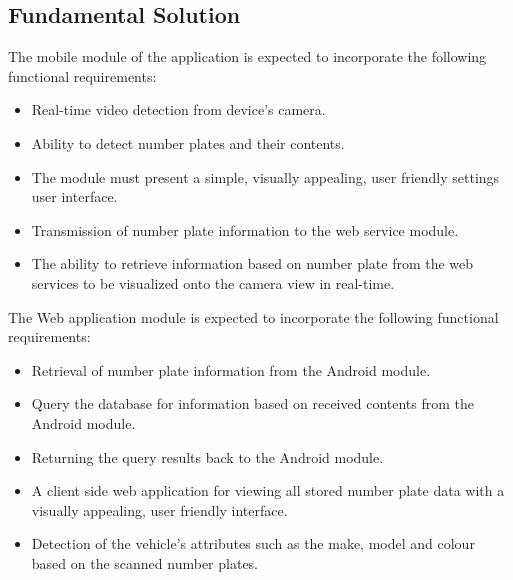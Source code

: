 \documentclass[12pt]{article}
\begin{document}
                         \subsection{Fundamental Solution}
                         The mobile module of the application is expected to incorporate the following functional requirements:
                             \begin{itemize}
         	                    \item Real-time video detection from device's camera. 
         	                    \item Ability to detect number plates and their contents.
         	                    \item The module must present a simple, visually appealing, user friendly settings user interface.
         	                    \item Transmission of number plate information to the web service module.
         	                    \item The ability to retrieve information based on number plate from the web services to be visualized onto the camera view in real-time.
                             \end{itemize}
                             
                             The Web application module is expected to incorporate the following functional requirements:
                             \begin{itemize}
                             	\item Retrieval of number plate information from the Android module.
                             	\item Query the database for information based on received contents from the Android module.
                             	\item Returning the query results back to the Android module.
                             	\item A client side web application for viewing all stored number plate data with a visually appealing, user friendly interface.
                             	\item Detection of the vehicle's attributes such as the make, model and colour based on the scanned number plates.
                             
                             \end{itemize}
                                 
\end{document}
